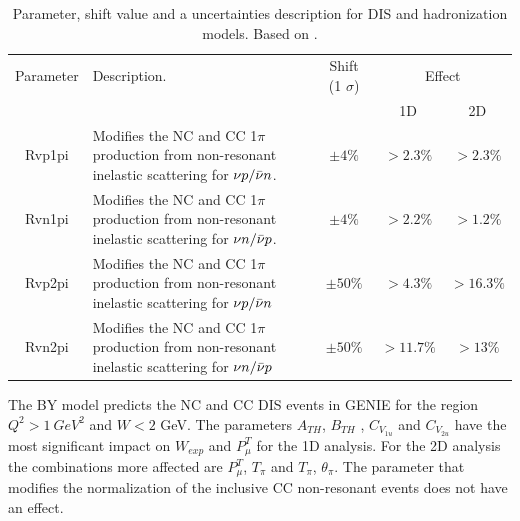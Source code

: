 \begin{table}[!htb]
    \centering
    \begin{tabular}{c|p{2.2in}|c|c|c}
        \hline 
        Parameter & Description.  & Shift (1 $\sigma$) & \multicolumn{2}{c}{Effect} \\
         & & & 1D & 2D \\
        \hline  
        Rvp1pi & Modifies the NC and CC 1$\pi$ production from non-resonant inelastic scattering for $\nu p/\Bar{\nu}n$. & $\pm4\%$ & $>2.3\%$ & $>2.3\%$\\ \hline
        Rvn1pi & Modifies the NC and CC 1$\pi$ production from non-resonant inelastic scattering for $\nu n/\Bar{\nu}p$. & $\pm4\%$ & $>2.2\%$ & $>1.2\%$\\ \hline
        Rvp2pi & Modifies the NC and CC 1$\pi$ production from non-resonant inelastic scattering for $\nu p/\Bar{\nu}n$ & $\pm50\%$ & $>4.3\%$ & $>16.3\%$\\ \hline
        Rvn2pi & Modifies the NC and CC 1$\pi$ production from non-resonant inelastic scattering for $\nu n/\Bar{\nu}p$ & $\pm50\%$ & $>11.7\%$ & $>13\%$\\ \hline
         
    \end{tabular}
    \caption{Parameter, shift value and a uncertainties description for DIS and hadronization models. Based on \cite{GENIEUnc}.}
    \label{tab:ErrorAnalysis:SystematicUnc:GenieNonRES}
\end{table}


The BY model predicts the NC and CC DIS events in GENIE for the region $Q^2 > 1\ GeV^2$ and $W<2$ GeV. The parameters $A_{TH}$, $B_{TH}$ , $C_{V_{1u}}$ and $C_{V_{2u}}$ have the most significant impact on  $W_{exp}$ and $P^T_\mu$ for the 1D analysis. For the 2D analysis the combinations more affected are $P^T_\mu$, $T_\pi$ and $T_\pi$, $\theta_\pi$. The parameter that modifies the normalization of the inclusive CC non-resonant events does not have an effect.

